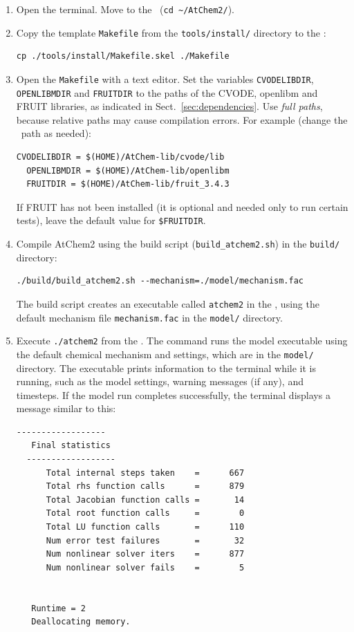 \begin{enumerate}
\item Open the terminal. Move to the \maindir\ (\verb|cd ~/AtChem2/|).
\item Copy the template \texttt{Makefile} from the \texttt{tools/install/} directory to the
  \maindir:
  \begin{Verbatim}[fontsize=\small]
  cp ./tools/install/Makefile.skel ./Makefile
  \end{Verbatim}
\item Open the \texttt{Makefile} with a text editor. Set the variables \texttt{CVODELIBDIR},
  \texttt{OPENLIBMDIR} and \texttt{FRUITDIR} to the paths of the CVODE, openlibm and FRUIT
  libraries, as indicated in Sect.~\ref{sec:dependencies}. Use \emph{full paths}, because
  relative paths may cause compilation errors. For example (change the \depdir\ path as
  needed):
  \begin{Verbatim}[fontsize=\small]
  CVODELIBDIR = $(HOME)/AtChem-lib/cvode/lib
  OPENLIBMDIR = $(HOME)/AtChem-lib/openlibm
  FRUITDIR = $(HOME)/AtChem-lib/fruit_3.4.3
  \end{Verbatim}
  If FRUIT has not been installed (it is optional and needed only to run certain tests), leave
  the default value for \texttt{\$FRUITDIR}.
\item Compile AtChem2 using the build script (\texttt{build\_atchem2.sh}) in the
  \texttt{build/} directory:
  \begin{Verbatim}[fontsize=\small]
  ./build/build_atchem2.sh --mechanism=./model/mechanism.fac
  \end{Verbatim}
  The build script creates an executable called \texttt{atchem2} in the \maindir, using the
  default mechanism file \texttt{mechanism.fac} in the \texttt{model/} directory.
\item Execute \verb|./atchem2| from the \maindir. The command runs the model executable using
  the default chemical mechanism and settings, which are in the \texttt{model/} directory. The
  executable prints information to the terminal while it is running, such as the model
  settings, warning messages (if any), and timesteps. If the model run completes successfully,
  the terminal displays a message similar to this:
  \begin{Verbatim}[fontsize=\small]
  ------------------
   Final statistics
  ------------------
      Total internal steps taken    =      667
      Total rhs function calls      =      879
      Total Jacobian function calls =       14
      Total root function calls     =        0
      Total LU function calls       =      110
      Num error test failures       =       32
      Num nonlinear solver iters    =      877
      Num nonlinear solver fails    =        5


   Runtime = 2
   Deallocating memory.
  \end{Verbatim}
\end{enumerate}

